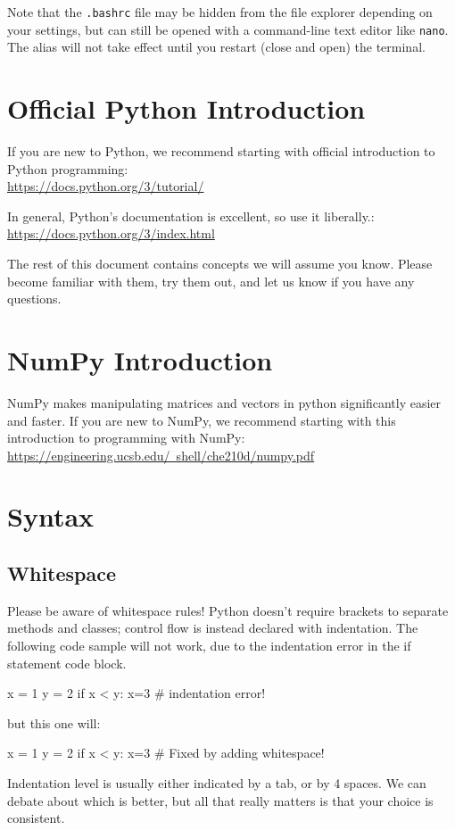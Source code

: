 \documentclass{article}
\begin{document}
Note that the \texttt{.bashrc} file may be hidden from the file explorer depending on your settings, but can still be opened with a command-line text editor like \texttt{nano}. The alias will not take effect until you restart (close and open) the terminal.

\section{Official Python Introduction}
If you are new to Python, we recommend starting with official introduction to Python programming:\\
\href{https://docs.python.org/3/tutorial/}{https://docs.python.org/3/tutorial/}

In general, Python's documentation is excellent, so use it liberally.:\\
\href{https://docs.python.org/3/index.html}{https://docs.python.org/3/index.html}

The rest of this document contains concepts we will assume you know. Please become familiar with them, try them out, and let us know if you have any questions.


\section{NumPy Introduction}
NumPy makes manipulating matrices and vectors in python significantly easier and faster.
If you are new to NumPy, we recommend starting with this introduction to programming with NumPy:\\
\href{https://engineering.ucsb.edu/~shell/che210d/numpy.pdf}{https://engineering.ucsb.edu/~shell/che210d/numpy.pdf}


\section{Syntax}
\subsection{Whitespace}
Please be aware of whitespace rules! Python doesn't require brackets to separate methods and classes; control flow is instead declared with indentation. The following code sample will not work, due to the indentation error in the if statement code block.
\begin{python}
x = 1
y = 2
if x < y:
x=3 # indentation error! 
\end{python}
but this one will:
\begin{python}
x = 1
y = 2
if x < y:
    x=3 # Fixed by adding whitespace!
\end{python}
Indentation level is usually either indicated by a tab, or by 4 spaces. We can debate about which is better, but all that really matters is that your choice is consistent.
\end{document}
